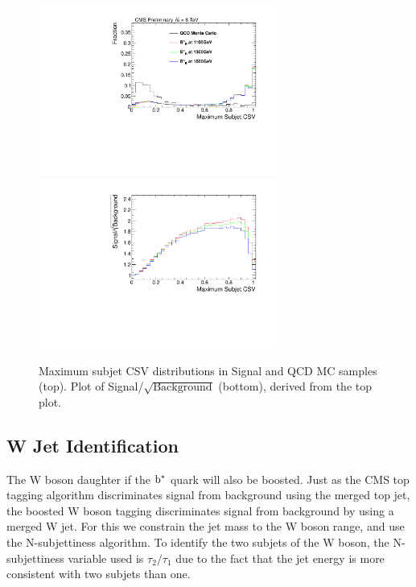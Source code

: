 \begin{figure}[htcb]
\begin{center}
\includegraphics[width=0.7\textwidth]{AN-14-049/figs/TopBDiscsjmaxCSVrightCompqcdandsignal.pdf}\\
\includegraphics[width=0.7\textwidth]{AN-14-049/figs/TopBDiscsjmaxCSVrightSNRqcdandsignal.pdf}
\caption{
Maximum subjet CSV distributions in Signal and QCD MC samples (top).  Plot of Signal/$\sqrt{\text{Background}}$ (bottom), derived from the top plot. 
}
\label{figs:bsBtagCOMP}
\end{center}
\end{figure}


\subsection{W Jet Identification}
\label{sec:bswtagging}
The W boson daughter if the $\mathrm{b}^{*}$ quark will also be boosted.  Just as the CMS top tagging algorithm discriminates signal from background 
using the merged top jet, the boosted W boson tagging discriminates signal from background by using a merged W jet.  For this we constrain the 
jet mass to the W boson range, and use the N-subjettiness algorithm.  To identify the two subjets of the W boson, the N-subjettiness variable used is 
$\tau_{2}/\tau_{1}$ due to the fact that the jet energy is more consistent with two subjets than one.
 
